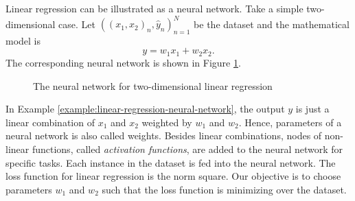 \begin{example}
  \label{example:linear-regression-neural-network}
  Linear regression can be illustrated as a neural network. Take a simple two-dimensional case. Let $((x_1,x_2)_n, \hat{y}_n)_{n=1}^N$ be the dataset and the mathematical model is
  $$y = w_1x_1 + w_2x_2.$$
  The corresponding neural network is shown in Figure \ref{figure:linear-regression-neural-network}.
  \begin{figure}[ht]
    \centering
    \vspace{0.5cm}
    \caption{The neural network for two-dimensional linear regression}
    \label{figure:linear-regression-neural-network}
  \end{figure}
\end{example}

In Example \ref{example:linear-regression-neural-network}, the output $y$ is just a linear combination of $x_1$ and $x_2$ weighted by $w_1$ and $w_2$. Hence, parameters of a neural network is also called weights. Besides linear combinations, nodes of non-linear functions, called \textit{activation functions}, are added to the neural network for specific tasks. Each instance in the dataset is fed into the neural network. The loss function for linear regression is the norm square. Our objective is to choose parameters $w_1$ and $w_2$ such that the loss function is minimizing over the dataset.

